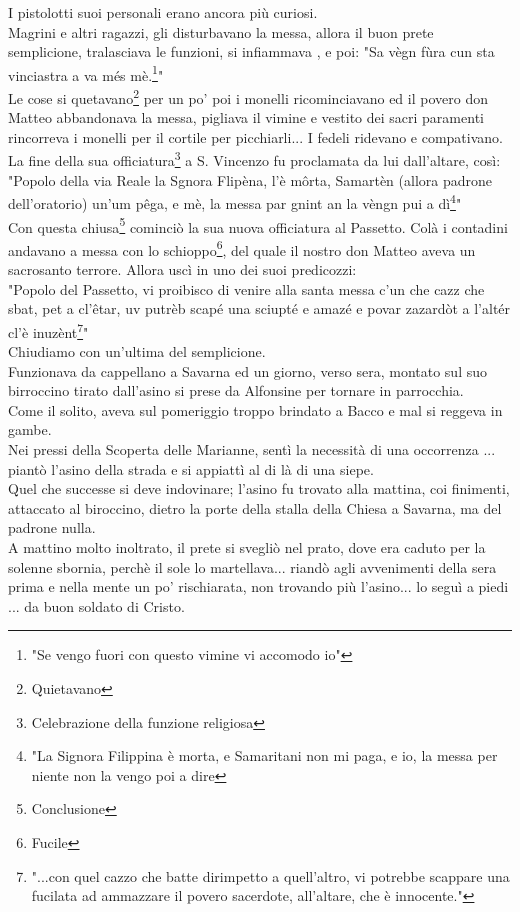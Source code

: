 \documentclass[10pt]{memoir} %
\begin{document}
I pistolotti suoi personali erano ancora più curiosi.\\
Magrini e altri ragazzi, gli disturbavano la messa, allora il buon prete semplicione, tralasciava le funzioni, si infiammava , e poi: "Sa vègn fùra cun sta vinciastra a va més mè.\footnote{"Se vengo fuori con questo vimine vi accomodo io"}"\\
Le cose si quetavano\footnote{Quietavano} per un po' poi i monelli ricominciavano ed il povero don Matteo abbandonava la messa, pigliava il vimine e vestito dei sacri paramenti rincorreva i monelli per il cortile per picchiarli... I fedeli ridevano e compativano. \\
La fine della sua officiatura\footnote{Celebrazione della funzione religiosa} a S. Vincenzo fu proclamata da lui dall'altare, così:\\
"Popolo della via Reale la Sgnora Flipèna, l'è môrta, Samartèn (allora padrone dell'oratorio) un'um pêga, e mè, la messa par gnint an la vèngn pui a dì\footnote{"La Signora Filippina è morta, e Samaritani non mi paga, e io, la messa per niente non la vengo poi a dire}"\\
Con questa chiusa\footnote{Conclusione} cominciò la sua nuova officiatura al Passetto. Colà i contadini andavano a messa con lo schioppo\footnote{Fucile}, del quale il nostro don Matteo aveva un sacrosanto terrore. Allora uscì in uno dei suoi predicozzi:\\
"Popolo del Passetto, vi proibisco di venire alla santa messa c'un che cazz che sbat, pet a cl'êtar, uv putrèb scapé una sciupté e amazé e povar zazardòt a l'altér cl'è inuzènt\footnote{"...con quel cazzo che batte dirimpetto a quell'altro, vi potrebbe scappare una fucilata ad ammazzare il povero sacerdote, all'altare, che è innocente."}"\\
Chiudiamo con un'ultima del semplicione.\\Funzionava da cappellano a Savarna ed un giorno, verso sera, montato sul suo birroccino tirato dall'asino si prese da Alfonsine per tornare in parrocchia. \\
Come il solito, aveva sul pomeriggio troppo brindato a Bacco e mal si reggeva in gambe.\\
Nei pressi della Scoperta delle Marianne, sentì la necessità di una occorrenza ... piantò l'asino della strada e si appiattì al di là di una siepe.\\
Quel che successe si deve indovinare; l'asino fu trovato alla mattina, coi finimenti, attaccato al biroccino, dietro la porte della stalla della Chiesa a Savarna, ma del padrone nulla.\\
A mattino molto inoltrato, il prete si svegliò nel prato, dove era caduto per la solenne sbornia, perchè il sole lo martellava... riandò agli avvenimenti della sera prima e nella mente un po' rischiarata, non trovando più l'asino... lo seguì a piedi ... da buon soldato di Cristo.
\end{document}
